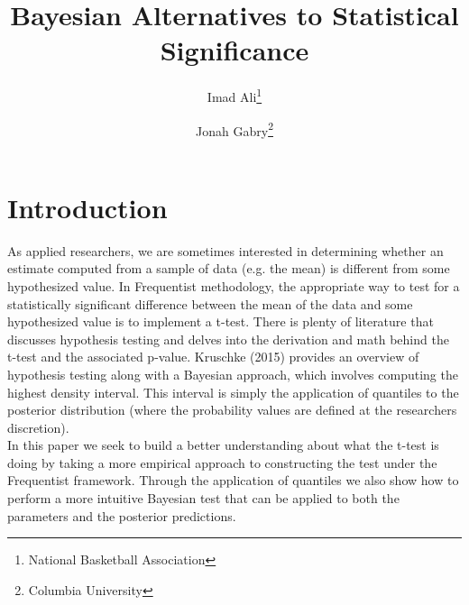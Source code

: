 \documentclass[12pt]{article}
\title{Bayesian Alternatives to Statistical Significance}
\author{Imad Ali\thanks{National Basketball Association} \and Jonah Gabry\thanks{Columbia University}}
\begin{document}
\maketitle
{}
\tableofcontents
\newpage

\def\ci{\perp\!\!\!\perp}
\def\ex{\mathbb{E}}
\def\prob{\mathbb{P}}
\def\ind{\mathbb{I}}
\def\grad{\triangledown}
\def\bigo{\mathcal{O}}

\section{Introduction}

As applied researchers, we are sometimes interested in determining whether an estimate computed from a sample of data (e.g. the mean) is different from some hypothesized value. In Frequentist methodology, the appropriate way to test for a statistically significant difference between the mean of the data and some hypothesized value is to implement a t-test. There is plenty of literature that discusses hypothesis testing and delves into the derivation and math behind the t-test and the associated p-value. Kruschke (2015) provides an overview of hypothesis testing along with a Bayesian approach, which involves computing the highest density interval. This interval is simply the application of quantiles to the posterior distribution (where the probability values are defined at the researchers discretion). \\

\noindent In this paper we seek to build a better understanding about what the t-test is doing by taking a more empirical approach to constructing the test under the Frequentist framework. Through the application of quantiles we also show how to perform a more intuitive Bayesian test that can be applied to both the parameters and the posterior predictions. \\
\end{document}
